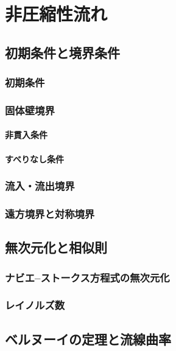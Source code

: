 \documentclass[uplatex,dvipdfmx,a4j,11pt]{jsreport}
\numberwithin{equation}{chapter}
\begin{document}
\chapter{非圧縮性流れ}

\section{初期条件と境界条件}

\subsection{初期条件}

\subsection{固体壁境界}

\subsubsection{非貫入条件}

\subsubsection{すべりなし条件}

\subsection{流入・流出境界}

\subsection{遠方境界と対称境界}

\section{無次元化と相似則}

\subsection{ナビエ--ストークス方程式の無次元化}

\subsection{レイノルズ数}

\section{ベルヌーイの定理と流線曲率}
\end{document}
